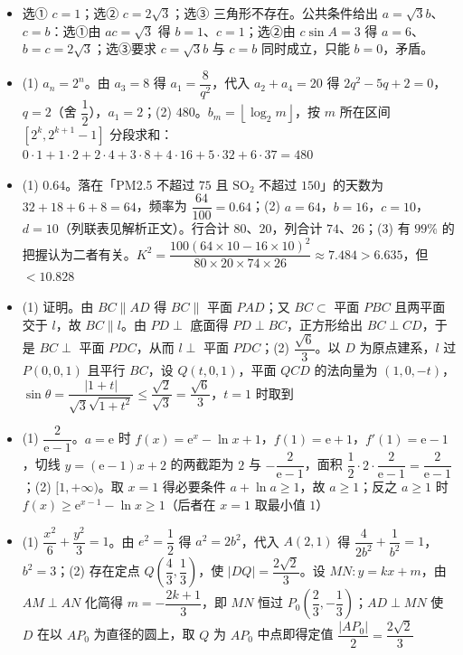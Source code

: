 \begin{itemize}[leftmargin=2.6em]
  \item[\textbf{17.}] 选① $c=1$；选② $c=2\sqrt3$；选③ 三角形不存在。公共条件给出 $a=\sqrt3b$、$c=b$：选①由 $ac=\sqrt3$ 得 $b=1$、$c=1$；选②由 $c\sin A=3$ 得 $a=6$、$b=c=2\sqrt3$；选③要求 $c=\sqrt3b$ 与 $c=b$ 同时成立，只能 $b=0$，矛盾。
  \item[\textbf{18.}] (1) $a_n=2^n$。由 $a_3=8$ 得 $a_1=\dfrac8{q^2}$，代入 $a_2+a_4=20$ 得 $2q^2-5q+2=0$，$q=2$（舍 $\dfrac12$），$a_1=2$；(2) $480$。$b_m=\left\lfloor\log_2m\right\rfloor$，按 $m$ 所在区间 $[2^k,2^{k+1}-1]$ 分段求和：$0\cdot1+1\cdot2+2\cdot4+3\cdot8+4\cdot16+5\cdot32+6\cdot37=480$
  \item[\textbf{19.}] (1) $0.64$。落在「PM2.5 不超过 $75$ 且 $\mathrm{SO_2}$ 不超过 $150$」的天数为 $32+18+6+8=64$，频率为 $\dfrac{64}{100}=0.64$；(2) $a=64$，$b=16$，$c=10$，$d=10$（列联表见解析正文）。行合计 $80$、$20$，列合计 $74$、$26$；(3) 有 $99\%$ 的把握认为二者有关。$K^2=\dfrac{100(64\times10-16\times10)^2}{80\times20\times74\times26}\approx7.484>6.635$，但 $<10.828$
  \item[\textbf{20.}] (1) 证明。由 $BC\parallel AD$ 得 $BC\parallel$ 平面 $PAD$；又 $BC\subset$ 平面 $PBC$ 且两平面交于 $l$，故 $BC\parallel l$。由 $PD\perp$ 底面得 $PD\perp BC$，正方形给出 $BC\perp CD$，于是 $BC\perp$ 平面 $PDC$，从而 $l\perp$ 平面 $PDC$；(2) $\dfrac{\sqrt6}3$。以 $D$ 为原点建系，$l$ 过 $P(0,0,1)$ 且平行 $BC$，设 $Q(t,0,1)$，平面 $QCD$ 的法向量为 $(1,0,-t)$，$\sin\theta=\dfrac{|1+t|}{\sqrt3\sqrt{1+t^2}}\leqslant\dfrac{\sqrt2}{\sqrt3}=\dfrac{\sqrt6}3$，$t=1$ 时取到
  \item[\textbf{21.}] (1) $\dfrac{2}{\mathrm e-1}$。$a=\mathrm e$ 时 $f(x)=\mathrm e^x-\ln x+1$，$f(1)=\mathrm e+1$，$f'(1)=\mathrm e-1$，切线 $y=(\mathrm e-1)x+2$ 的两截距为 $2$ 与 $-\dfrac2{\mathrm e-1}$，面积 $\dfrac12\cdot2\cdot\dfrac2{\mathrm e-1}=\dfrac2{\mathrm e-1}$；(2) $[1,+\infty)$。取 $x=1$ 得必要条件 $a+\ln a\geqslant1$，故 $a\geqslant1$；反之 $a\geqslant1$ 时 $f(x)\geqslant\mathrm e^{x-1}-\ln x\geqslant1$（后者在 $x=1$ 取最小值 $1$）
  \item[\textbf{22.}] (1) $\dfrac{x^2}6+\dfrac{y^2}3=1$。由 $e^2=\dfrac12$ 得 $a^2=2b^2$，代入 $A(2,1)$ 得 $\dfrac4{2b^2}+\dfrac1{b^2}=1$，$b^2=3$；(2) 存在定点 $Q\left(\dfrac43,\dfrac13\right)$，使 $|DQ|=\dfrac{2\sqrt2}3$。设 $MN:y=kx+m$，由 $AM\perp AN$ 化简得 $m=-\dfrac{2k+1}3$，即 $MN$ 恒过 $P_0\left(\dfrac23,-\dfrac13\right)$；$AD\perp MN$ 使 $D$ 在以 $AP_0$ 为直径的圆上，取 $Q$ 为 $AP_0$ 中点即得定值 $\dfrac{|AP_0|}2=\dfrac{2\sqrt2}3$
\end{itemize}
